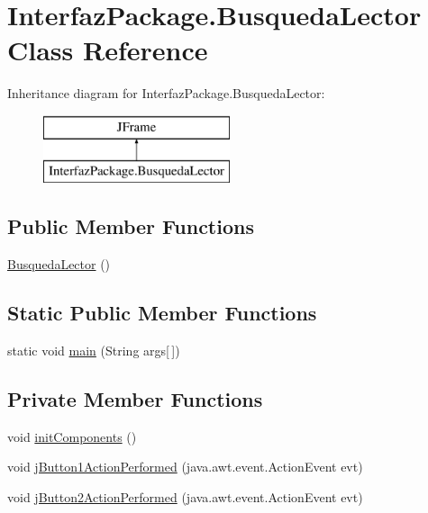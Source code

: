 \hypertarget{class_interfaz_package_1_1_busqueda_lector}{}\section{Interfaz\+Package.\+Busqueda\+Lector Class Reference}
\label{class_interfaz_package_1_1_busqueda_lector}
Inheritance diagram for Interfaz\+Package.\+Busqueda\+Lector\+:\begin{figure}[H]
\begin{center}
\leavevmode
\includegraphics[height=2.000000cm]{class_interfaz_package_1_1_busqueda_lector}
\end{center}
\end{figure}
\subsection*{Public Member Functions}
\begin{DoxyCompactItemize}
\item 
\mbox{\hyperlink{class_interfaz_package_1_1_busqueda_lector_a2694b304cc19f63494b4a46e0501063d}{Busqueda\+Lector}} ()
\end{DoxyCompactItemize}
\subsection*{Static Public Member Functions}
\begin{DoxyCompactItemize}
\item 
static void \mbox{\hyperlink{class_interfaz_package_1_1_busqueda_lector_a127aad1b565f831a1ab09f67673810e7}{main}} (String args\mbox{[}$\,$\mbox{]})
\end{DoxyCompactItemize}
\subsection*{Private Member Functions}
\begin{DoxyCompactItemize}
\item 
void \mbox{\hyperlink{class_interfaz_package_1_1_busqueda_lector_aed51740a2e167797bac39332221f591c}{init\+Components}} ()
\item 
void \mbox{\hyperlink{class_interfaz_package_1_1_busqueda_lector_aca34c3e668393db6c3cc644af9fbade9}{j\+Button1\+Action\+Performed}} (java.\+awt.\+event.\+Action\+Event evt)
\item 
void \mbox{\hyperlink{class_interfaz_package_1_1_busqueda_lector_a263c105aa087b2de3d2c5b88a0252131}{j\+Button2\+Action\+Performed}} (java.\+awt.\+event.\+Action\+Event evt)
\end{DoxyCompactItemize}
